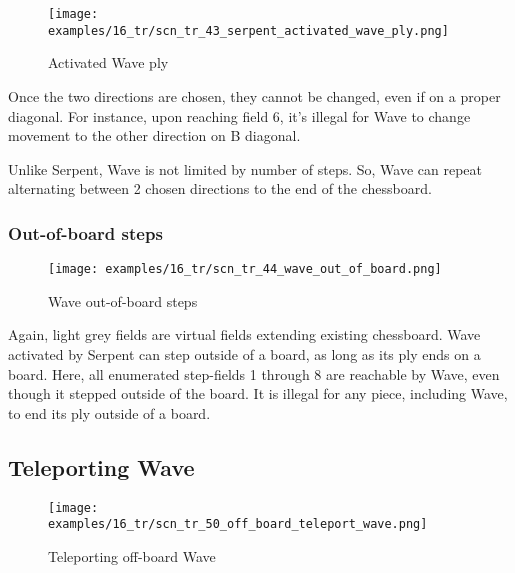 \noindent
\begin{figure}[!h]
\texttt{[image: examples/16\_tr/scn\_tr\_43\_serpent\_activated\_wave\_ply.png]}
\caption{Activated Wave ply}
\label{fig:scn_tr_43_serpent_activated_wave_ply}
\end{figure}

Once the two directions are chosen, they cannot be changed, even if on a
proper diagonal. For instance, upon reaching field 6, it's illegal for Wave
to change movement to the other direction on B diagonal.

Unlike Serpent, Wave is not limited by number of steps. So, Wave can repeat
alternating between 2 chosen directions to the end of the chessboard.

\clearpage %

\subsubsection*{Out-of-board steps}
\label{sec:Tamoanchan Revisited/Serpent/Activating Wave/Out-of-board steps}

\vspace*{-1.0\baselineskip}
\noindent
\begin{figure}[!h]
\texttt{[image: examples/16\_tr/scn\_tr\_44\_wave\_out\_of\_board.png]}
\caption{Wave out-of-board steps}
\label{fig:scn_tr_44_wave_out_of_board}
\end{figure}

Again, light grey fields are virtual fields extending existing chessboard.
Wave activated by Serpent can step outside of a board, as long as its ply
ends on a board. Here, all enumerated step-fields 1 through 8 are reachable
by Wave, even though it stepped outside of the board. It is illegal for any
piece, including Wave, to end its ply outside of a board.

\clearpage %

\subsection*{Teleporting Wave}
\label{sec:Tamoanchan Revisited/Serpent/Teleporting Wave}

\vspace*{-1.0\baselineskip}
\noindent
\begin{figure}[!h]
\texttt{[image: examples/16\_tr/scn\_tr\_50\_off\_board\_teleport\_wave.png]}
\caption{Teleporting off-board Wave}
\label{fig:scn_tr_50_off_board_teleport_wave}
\end{figure}

